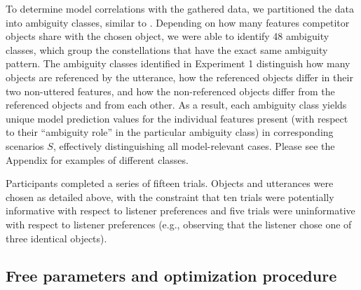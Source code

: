 \documentclass[11pt,a4paper]{article}
\begin{document}
To determine model correlations with the gathered data, we partitioned the data into ambiguity classes, similar to . Depending on how many features competitor objects share with the chosen object, we were able to identify 48 ambiguity classes, which group the constellations that have the exact same ambiguity pattern. The ambiguity classes identified in Experiment 1 distinguish how many objects are referenced by the utterance, how the referenced objects differ in their two non-uttered features, and how the non-referenced objects differ from the referenced objects and from each other.
As a result, each ambiguity class yields unique model prediction values for the individual features present (with respect to their ``ambiguity role'' in the particular ambiguity class) in corresponding scenarios $S$, effectively distinguishing all model-relevant cases. Please see the Appendix for examples of different classes.



Participants completed a series of fifteen trials. Objects and utterances were chosen as detailed above, with the constraint that ten trials were potentially informative with respect to listener preferences and five trials were uninformative with respect to listener preferences (e.g., observing that the listener chose one of three identical objects). 

\subsection{Free parameters and optimization procedure}
\end{document}
